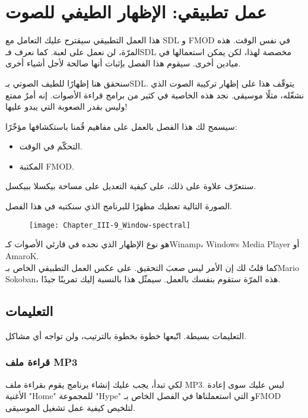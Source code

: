\chapter{عمل تطبيقي: الإظهار الطيفي للصوت}

هذا العمل التطبيقي سيقترح عليك التعامل مع
\textenglish{SDL}
و
\textenglish{FMOD}
في نفس الوقت. هذه المرّة، لن نعمل على لعبة. كما نعرف فـ\textenglish{SDL}
مخصصة لهذا، لكن يمكن استعمالها في ميادين أخرى. سيقوم هذا الفصل بإثبات أنها صالحة لأجل أشياء أخرى.

سنحقق هنا إظهارًا للطيف الصوتي بـ\textenglish{SDL}.
يتوقّف هذا على إظهار تركيبة الصوت الذي نشغّله، مثلًا موسيقى. نجد هذه الخاصية في كثير من برامج قراءة الأصوات. إنه أمرٌ ممتع وليس بقدر الصعوبة التي يبدو عليها!

سيسمح لك هذا الفصل بالعمل على مفاهيم قُمنا باستكشافها مؤخّرًا:

\begin{itemize}
	\item التحكّم في الوقت.
	\item المكتبة 
	\textenglish{FMOD}.
\end{itemize}

سنتعرّف علاوة على ذلك، على كيفية التعديل على مساحة بيكسلا ببيكسل.

الصورة التالية تعطيك مظهرًا للبرنامج الذي سنكتبه في هذا الفصل.

\begin{figure}[H]
	\centering
	\texttt{[image: Chapter\_III-9\_Window-spectral]}
\end{figure}

هو نوع الإظهار الذي نجده في قارئي الأصوات كـ\textenglish{Winamp}،
\textenglish{Windows Media Player} أو \textenglish{AmaroK}.\\
كما قلتُ لك إن الأمر ليس صعبَ التحقيق. على عكس العمل التطبيقي الخاص بـ\textenglish{Mario Sokoban}،
هذه المرّة ستقوم بنفسك بالعمل. سيمثّل هذا بالنسبة إليك تمرينًا جيدًا.

\section{التعليمات}

التعليمات بسيطة. اتّبعها خطوة بخطوة بالترتيب، ولن تواجه أي مشاكل.

\subsection{قراءة ملف \textenglish{MP3}}

لكي تبدأ، يجب عليك إنشاء برنامج يقوم بقراءة ملف
\textenglish{MP3}. ليس عليك سوى إعادة
الأغنية 
"\textenglish{Home}"
للمجموعة
"\textenglish{Hype}"
و التي استعملناها في الفصل الخاص بـ\textenglish{FMOD}
لتلخيص كيفية عمل تشغيل الموسيقى.

